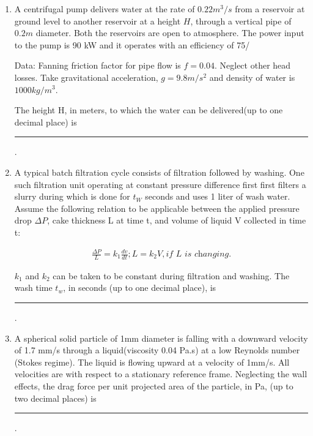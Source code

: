 \documentclass[journal,12pt,onecolumn]{IEEEtran}
\theoremstyle{remark}
\begin{document}
\begin{enumerate}
\begin{multicols}{4}
    \begin{enumerate}
        \item C, D, E
        \item A, B, D
        \item A, C, D
        \item A, B, D, E
    \end{enumerate}
\end{multicols}

    \item A centrifugal pump delivers water at the rate of $0.22 m^3/s$ from a reservoir at ground level to another reservoir at a height $H$, through a vertical pipe of $0.2 m$ diameter. Both the reservoirs are open to atmosphere. The power input to the pump is 90 kW and it operates with an efficiency of 75/%

    Data:
    Fanning friction factor for pipe flow is $f=0.04$. Neglect other head losses.
    Take gravitational acceleration, $g = 9.8 m/s^2$ and density of water is $1000kg/m^3$. 

    The height H, in meters, to which the water can be delivered(up to one decimal place) is \rule{40pt}{0.1mm}.

\hfill{}
    \item A typical batch filtration cycle consists of filtration followed by washing. One such filtration unit operating at constant pressure difference first first filters a slurry during which is done for $t_W$ seconds and uses 1 liter of wash water. Assume the following relation to be applicable between the applied pressure drop $\Delta P$, cake thickness L at time t, and volume of liquid V collected in time t:

    \begin{align*}
        \frac{\Delta P}{L} = k_1 \frac{dv}{dt} ; L = k_2V, \textit{if L is changing}.
    \end{align*}

    $k_1$ and $k_2$ can be taken to be constant during filtration and washing. The wash time $t_w$, in seconds (up to one decimal place), is \rule{40pt}{0.1mm}.

\hfill{}
        \item A spherical solid particle of 1mm diameter is falling with a downward velocity of 1.7 mm/s through a liquid(viscosity 0.04 Pa.s) at a low Reynolds number (Stokes regime). The liquid is flowing upward at a velocity of 1mm/s. All velocities are with respect to a stationary reference frame. Neglecting the wall effects, the drag force per unit projected area of the particle, in Pa, (up to two decimal places) is \rule{40pt}{0.1mm}.


\end{enumerate}
\end{document}
